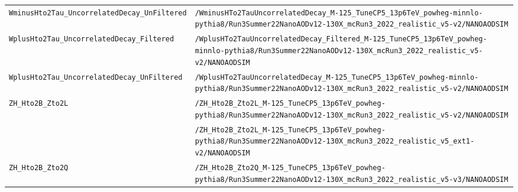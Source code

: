 \begin{longtable}{@{}>{\RaggedRight\arraybackslash}p{} >{\RaggedRight\arraybackslash}p{}@{}}
\addlinespace[2pt]
\texttt{WminusHto2Tau\_\allowbreak{}UncorrelatedDecay\_\allowbreak{}UnFiltered} & \texttt{/\allowbreak{}WminusHTo2TauUncorrelatedDecay\_\allowbreak{}M-\allowbreak{}125\_\allowbreak{}TuneCP5\_\allowbreak{}13p6TeV\_\allowbreak{}powheg-\allowbreak{}minnlo-\allowbreak{}pythia8/\allowbreak{}Run3Summer22NanoAODv12-\allowbreak{}130X\_\allowbreak{}mcRun3\_\allowbreak{}2022\_\allowbreak{}realistic\_\allowbreak{}v5-\allowbreak{}v2/\allowbreak{}NANOAODSIM} \\
\addlinespace[2pt]
\texttt{WplusHto2Tau\_\allowbreak{}UncorrelatedDecay\_\allowbreak{}Filtered} & \texttt{/\allowbreak{}WplusHTo2TauUncorrelatedDecay\_\allowbreak{}Filtered\_\allowbreak{}M-\allowbreak{}125\_\allowbreak{}TuneCP5\_\allowbreak{}13p6TeV\_\allowbreak{}powheg-\allowbreak{}minnlo-\allowbreak{}pythia8/\allowbreak{}Run3Summer22NanoAODv12-\allowbreak{}130X\_\allowbreak{}mcRun3\_\allowbreak{}2022\_\allowbreak{}realistic\_\allowbreak{}v5-\allowbreak{}v2/\allowbreak{}NANOAODSIM} \\
\addlinespace[2pt]
\texttt{WplusHto2Tau\_\allowbreak{}UncorrelatedDecay\_\allowbreak{}UnFiltered} & \texttt{/\allowbreak{}WplusHTo2TauUncorrelatedDecay\_\allowbreak{}M-\allowbreak{}125\_\allowbreak{}TuneCP5\_\allowbreak{}13p6TeV\_\allowbreak{}powheg-\allowbreak{}minnlo-\allowbreak{}pythia8/\allowbreak{}Run3Summer22NanoAODv12-\allowbreak{}130X\_\allowbreak{}mcRun3\_\allowbreak{}2022\_\allowbreak{}realistic\_\allowbreak{}v5-\allowbreak{}v2/\allowbreak{}NANOAODSIM} \\
\addlinespace[2pt]
\texttt{ZH\_\allowbreak{}Hto2B\_\allowbreak{}Zto2L} & \texttt{/\allowbreak{}ZH\_\allowbreak{}Hto2B\_\allowbreak{}Zto2L\_\allowbreak{}M-\allowbreak{}125\_\allowbreak{}TuneCP5\_\allowbreak{}13p6TeV\_\allowbreak{}powheg-\allowbreak{}pythia8/\allowbreak{}Run3Summer22NanoAODv12-\allowbreak{}130X\_\allowbreak{}mcRun3\_\allowbreak{}2022\_\allowbreak{}realistic\_\allowbreak{}v5-\allowbreak{}v2/\allowbreak{}NANOAODSIM} \\
 & \texttt{/\allowbreak{}ZH\_\allowbreak{}Hto2B\_\allowbreak{}Zto2L\_\allowbreak{}M-\allowbreak{}125\_\allowbreak{}TuneCP5\_\allowbreak{}13p6TeV\_\allowbreak{}powheg-\allowbreak{}pythia8/\allowbreak{}Run3Summer22NanoAODv12-\allowbreak{}130X\_\allowbreak{}mcRun3\_\allowbreak{}2022\_\allowbreak{}realistic\_\allowbreak{}v5\_\allowbreak{}ext1-\allowbreak{}v2/\allowbreak{}NANOAODSIM} \\
\addlinespace[2pt]
\texttt{ZH\_\allowbreak{}Hto2B\_\allowbreak{}Zto2Q} & \texttt{/\allowbreak{}ZH\_\allowbreak{}Hto2B\_\allowbreak{}Zto2Q\_\allowbreak{}M-\allowbreak{}125\_\allowbreak{}TuneCP5\_\allowbreak{}13p6TeV\_\allowbreak{}powheg-\allowbreak{}pythia8/\allowbreak{}Run3Summer22NanoAODv12-\allowbreak{}130X\_\allowbreak{}mcRun3\_\allowbreak{}2022\_\allowbreak{}realistic\_\allowbreak{}v5-\allowbreak{}v3/\allowbreak{}NANOAODSIM} \\

\end{longtable}
